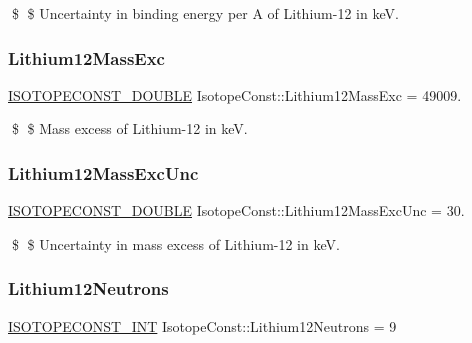 \$ \$ Uncertainty in binding energy per A of Lithium-\/12 in keV. \mbox{\label{group___isotope_const-_lithium-_li12_ga8ef615fa1f9367d79bffba919afe8fa2}} 
\subsubsection{\texorpdfstring{Lithium12\+Mass\+Exc}{Lithium12MassExc}}
{\footnotesize\ttfamily \mbox{\hyperlink{group___isotope_const-_macros_ga8f45a7272ce02c0b4c65c44636ed719a}{I\+S\+O\+T\+O\+P\+E\+C\+O\+N\+S\+T\+\_\+\+D\+O\+U\+B\+LE}} Isotope\+Const\+::\+Lithium12\+Mass\+Exc = 49009.}

\$ \$ Mass excess of Lithium-\/12 in keV. \mbox{\label{group___isotope_const-_lithium-_li12_ga347fc1fcc550c3cd9d4a679cc47ce4ee}} 
\subsubsection{\texorpdfstring{Lithium12\+Mass\+Exc\+Unc}{Lithium12MassExcUnc}}
{\footnotesize\ttfamily \mbox{\hyperlink{group___isotope_const-_macros_ga8f45a7272ce02c0b4c65c44636ed719a}{I\+S\+O\+T\+O\+P\+E\+C\+O\+N\+S\+T\+\_\+\+D\+O\+U\+B\+LE}} Isotope\+Const\+::\+Lithium12\+Mass\+Exc\+Unc = 30.}

\$ \$ Uncertainty in mass excess of Lithium-\/12 in keV. \mbox{\label{group___isotope_const-_lithium-_li12_ga21a46e79bff008ada1388ee8bfe103e8}} 
\subsubsection{\texorpdfstring{Lithium12\+Neutrons}{Lithium12Neutrons}}
{\footnotesize\ttfamily \mbox{\hyperlink{group___isotope_const-_macros_ga5f18360b3e99483a35c32d789e62621c}{I\+S\+O\+T\+O\+P\+E\+C\+O\+N\+S\+T\+\_\+\+I\+NT}} Isotope\+Const\+::\+Lithium12\+Neutrons = 9}

